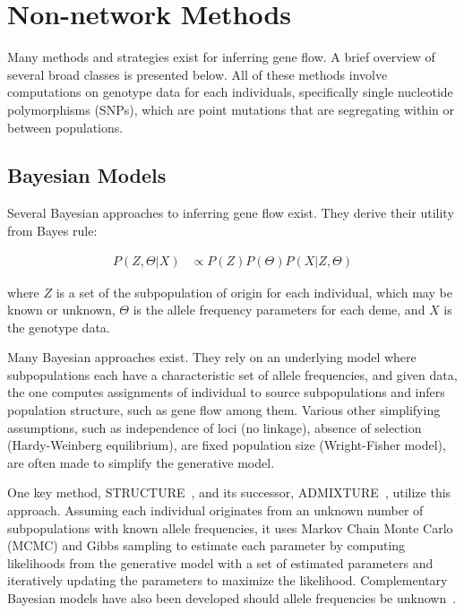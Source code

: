 \documentclass{essay}
\begin{document}
\section{Non-network Methods}

Many methods and strategies exist for inferring gene flow. A brief overview of
several broad classes is presented below. All of these methods involve
computations on genotype data for each individuals, specifically single
nucleotide polymorphisms (SNPs), which are point mutations that are segregating
within or between populations.

\subsection{Bayesian Models}

Several Bayesian approaches to inferring gene flow exist. They derive their
utility from Bayes rule:

\begin{align}
  P(Z, \Theta | X) &\propto P(Z) P(\Theta) P(X|Z,\Theta)
\end{align}

where $Z$ is a set of the subpopulation of origin for each individual, which
may be known or unknown, $\Theta$ is the allele frequency parameters for each
deme, and $X$ is the genotype data.

Many Bayesian approaches exist. They rely on an underlying model where
subpopulations each have a characteristic set of allele frequencies, and given
data, the one computes assignments of individual to source subpopulations and
infers population structure, such as gene flow among them. Various other
simplifying assumptions, such as independence of loci (no linkage), absence of
selection (Hardy-Weinberg equilibrium), are fixed population size
(Wright-Fisher model), are often made to simplify the generative model.

One key method, STRUCTURE~\cite{pritchard_inference_2000}, and its successor,
ADMIXTURE~\cite{falush_inference_nodate}, utilize this approach. Assuming each
individual originates from an unknown number of subpopulations with known
allele frequencies, it uses Markov Chain Monte Carlo (MCMC) and Gibbs sampling
to estimate each parameter by computing likelihoods from the generative model
with a set of estimated parameters and iteratively updating the parameters to
maximize the likelihood. Complementary Bayesian models have also been developed
should allele frequencies be unknown~\cite{corander_bayesian_nodate}.
\end{document}

